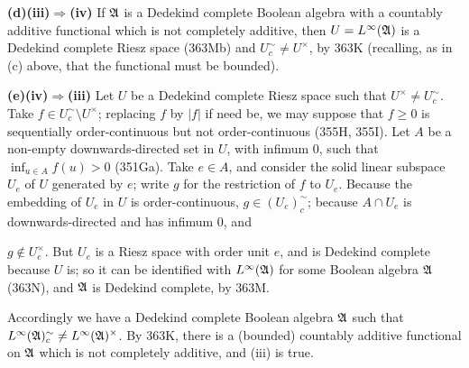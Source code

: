 {\medskip

{\bf (d)(iii)$\Rightarrow$(iv)} If $\frak A$ is a Dedekind complete
Boolean algebra with a countably additive functional which is not
completely additive, then $U=L^{\infty}(\frak A)$ is a Dedekind complete
Riesz space (363Mb) and $U^{\sim}_c\ne U^{\times}$, by 363K (recalling,
as in (c) above, that the functional must be bounded).

\medskip

{\bf (e)(iv)$\Rightarrow$(iii)} Let $U$ be a Dedekind complete Riesz
space such that $U^{\times}\ne U^{\sim}_c$.   Take
$f\in U^{\sim}_c\setminus U^{\times}$;  replacing $f$ by $|f|$ if need be,
we may suppose that $f\ge 0$ is sequentially order-continuous but not
order-continuous (355H, 355I).   Let $A$ be a non-empty
downwards-directed set in $U$, with infimum $0$, such that
$\inf_{u\in A}f(u)>0$ (351Ga).   Take $e\in A$, and consider the solid
linear subspace $U_e$ of $U$ generated by $e$;  write $g$ for the
restriction of $f$ to $U_e$.   Because the embedding of $U_e$ in $U$ is
order-continuous, $g\in (U_e)^{\sim}_c$;  because $A\cap U_e$ is
downwards-directed and has infimum $0$, and


\noindent $g\notin U_e^{\times}$.   But $U_e$ is a Riesz space with
order unit $e$, and is Dedekind complete because $U$ is;  so it
can be identified with $L^{\infty}(\frak A)$ for some Boolean algebra
$\frak A$ (363N), and $\frak A$ is Dedekind complete, by 363M.

Accordingly we have a Dedekind complete Boolean algebra $\frak A$ such
that $L^{\infty}(\frak A)^{\sim}_c\ne L^{\infty}(\frak A)^{\times}$.
By 363K, there is a (bounded) countably additive functional on $\frak A$
which is not completely additive, and (iii) is true.
}%

